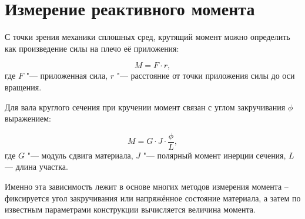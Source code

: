 \section{Измерение реактивного момента}


С точки зрения механики сплошных сред, крутящий момент можно определить как произведение силы на плечо её приложения:

\begin{equation}
	\label{eq:eq_Torque}
	M=F \cdot r,
\end{equation}
где \(F\) "--- приложенная сила, \(r\) "--- расстояние от точки приложения силы до оси вращения.

Для вала круглого сечения при кручении момент связан с углом закручивания $\phi$ выражением:

\begin{equation}
	\label{eq:eq_torque}
	M=G\cdot J \cdot \frac{\phi}{L},
\end{equation}
где \(G\) "--- модуль сдвига материала, \(J\) "--- полярный момент инерции сечения, \(L\) --- длина участка.

Именно эта зависимость лежит в основе многих методов измерения момента -- фиксируется угол закручивания или напряжённое состояние материала, а затем по известным параметрами конструкции вычисляется величина момента.

